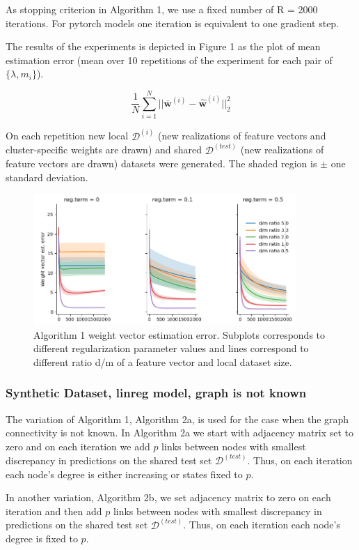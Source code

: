 \documentclass{article}
\begin{document}
As stopping criterion in Algorithm 1, we use a fixed number of R = 2000 iterations. 
For pytorch models one iteration is equivalent to one gradient step.

The results of the experiments is depicted in Figure 1 as the plot of mean estimation error (mean over 10 repetitions of the experiment for each pair of $\{\lambda, m_i \}$).

\begin{equation}
\frac{1}{N} \sum_{i=1}^{N} ||\mathbf{\overline{w}}^{(i)} - \mathbf{\widehat{w}}^{(i)}||^2_2
\end{equation}

On each repetition new local $\mathcal{D}^{(i)}$ (new realizations of feature vectors and cluster-specific weights are drawn) and shared $\mathcal{D}^{(test)}$ (new realizations of feature vectors are drawn) datasets were generated. The shaded region is $\pm$ one standard deviation.  

\begin{figure}[h]
\includegraphics[width=10cm]{linreg.png}
\caption{Algorithm 1 weight vector estimation error. Subplots corresponds to different regularization parameter values and lines correspond to different ratio d/m of a feature vector and local dataset size.}
\end{figure}

\subsubsection{Synthetic Dataset, linreg model, graph is not known}

The variation of Algorithm 1, Algorithm 2a, is used for the case when the graph connectivity is not known. In Algorithm 2a we start with adjacency matrix set to zero and on each iteration we add $p$ links between nodes with smallest discrepancy in predictions on the shared test set $\mathcal{D}^{(test)}$. Thus, on each iteration each node's degree is either increasing or states fixed to $p$.

In another variation, Algorithm 2b, we set adjacency matrix to zero on each iteration and then add $p$ links between nodes with smallest discrepancy in predictions on the shared test set $\mathcal{D}^{(test)}$. Thus, on each iteration each node's degree is fixed to $p$.
\end{document}
